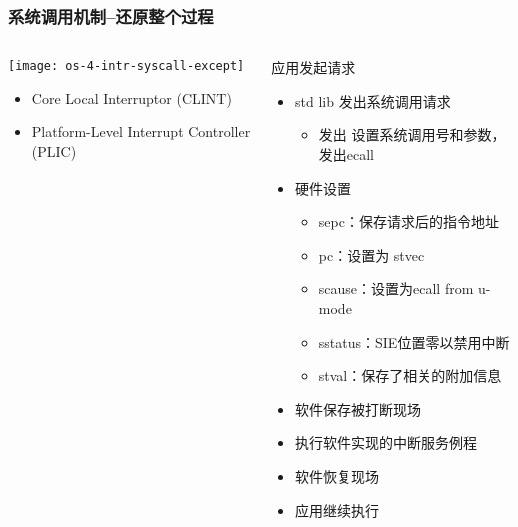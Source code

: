 \begin{frame}[plain,t]
	\frametitle{系统调用机制--还原整个过程}
	\begin{columns}
		
		\begin{column}{0.4\textwidth}
			\centering
			\texttt{[image: os-4-intr-syscall-except]}
			\begin{itemize} \small
				\item Core Local	Interruptor (CLINT)
				\item Platform-Level Interrupt Controller (PLIC)
			\end{itemize}
			
		\end{column}
		
		\begin{column}{0.5\textwidth}
			
			应用发起请求
			\begin{itemize} \small 
				\item std lib 发出系统调用请求
				\begin{itemize} \small 
					\item 发出 设置系统调用号和参数，发出ecall	

				\end{itemize}				
				\item 硬件设置
				\begin{itemize} \small 
					\item sepc：保存请求后的指令地址	
					\item pc：设置为 stvec
					\item scause：设置为ecall from u-mode
					\item sstatus：SIE位置零以禁用中断					
					\item stval：保存了相关的附加信息
				\end{itemize}
				\item 软件保存被打断现场\pause
				\item 执行软件实现的中断服务例程
				\item 软件恢复现场
				\item 应用继续执行
				
			\end{itemize}
			
		\end{column}
		
	\end{columns}
	
\end{frame}	


